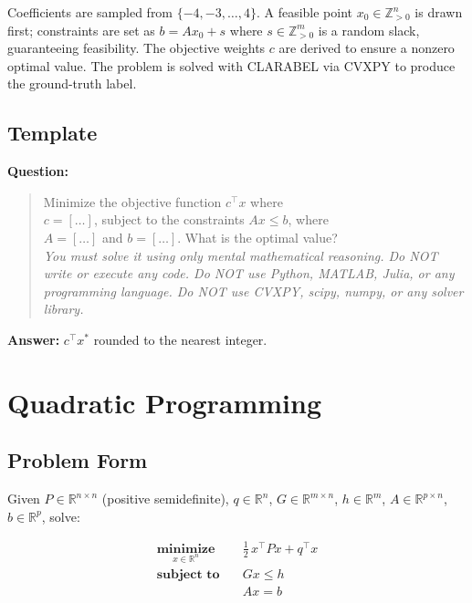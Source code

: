 \documentclass[12pt]{article}
\begin{document}
Coefficients are sampled from $\{-4, -3, \ldots, 4\}$.
A feasible point $x_0 \in \mathbb{Z}_{>0}^n$ is drawn first; constraints are set as
$b = Ax_0 + s$ where $s \in \mathbb{Z}_{>0}^m$ is a random slack, guaranteeing
feasibility. The objective weights $c$ are derived to ensure a nonzero optimal value.
The problem is solved with CLARABEL via CVXPY to produce the ground-truth label.

\subsection{Template}

\vspace{6pt}
\noindent\textbf{Question:}
\begin{quote}
Minimize the objective function $c^\top x$ where\\
$c = [\ldots]$, subject to the constraints $Ax \leq b$, where\\
$A = [\ldots]$ and $b = [\ldots]$.
What is the optimal value?\\[4pt]
\textit{You must solve it using only mental mathematical reasoning.
Do NOT write or execute any code.
Do NOT use Python, MATLAB, Julia, or any programming language.
Do NOT use CVXPY, scipy, numpy, or any solver library.}
\end{quote}

\noindent\textbf{Answer:} $c^\top x^*$ rounded to the nearest integer.


\section{Quadratic Programming}

\subsection{Problem Form}

Given $P \in \mathbb{R}^{n \times n}$ (positive semidefinite), $q \in \mathbb{R}^n$,
$G \in \mathbb{R}^{m \times n}$, $h \in \mathbb{R}^m$,
$A \in \mathbb{R}^{p \times n}$, $b \in \mathbb{R}^p$, solve:

\begin{align*}
    \underset{x \in \mathbb{R}^n}{\textbf{minimize}}   \quad & \tfrac{1}{2}\, x^\top P x + q^\top x \\
    \textbf{subject to} \quad                                  & Gx \leq h \\
                                                               & Ax = b
\end{align*}
\end{document}
